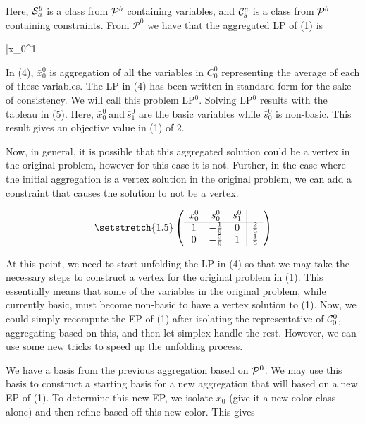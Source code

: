 \documentclass[11pt]{article} %
\newcommand{\cP}{{\cal P}}
\newcommand{\cC}{{\cal C}}
\newcommand{\cS}{{\cal S}}
\begin{document}
	Here, $\cS_a^b$ is a class from $\cP^b$ containing variables, and $\cC_b^a$ is a class from $\cP^b$ containing constraints.  From $\mathcal{P}^0$ we have that the aggregated LP of (1) is  
	
	\begin{mini!}
		{}{\bar{x}_0^1}{}{}
	\end{mini!}
	
	In (4), $\bar{x}_0^0$ is aggregation of all the variables in $C_0^0$ representing the average of each of these variables.  The LP in (4) has been written in standard form for the sake of consistency. We will call this problem LP$^0$. Solving LP$^0$ results with the tableau in (5).  Here, $\bar{x}_0^0 \ \text{and} \ \bar{s}_1^0$ are the basic variables while $\bar{s}_0^0$ is non-basic.  This result gives an objective value in (1) of 2.
	
	Now, in general, it is possible that this aggregated solution could be a vertex in the original problem, however for this case it is not.  Further, in the case where the initial aggregation is a vertex solution in the original problem, we can add a constraint that causes the solution to not be a vertex.
	
	\begin{equation}\setstretch{1.5}
	\begin{pmatrix}
	\begin{array}{ccc|c}
	\bar{x}_0^0 & \bar{s}_0^0 & \bar{s}_1^0 \\
	\hline
	1 & -\frac{1}{9} & 0 & \frac{2}{9} \\
	0 & -\frac{5}{9} & 1 & \frac{1}{9} 
	\end{array}
	\end{pmatrix}
	\end{equation}
	
	At this point, we need to start unfolding the LP in (4) so that we may take the necessary steps to construct a vertex for the original problem in (1).  This essentially means that some of the variables in the original problem, while currently basic, must become non-basic to have a vertex solution to (1).  Now, we could simply recompute the EP of (1) after isolating the representative of $\cC_0^0$, aggregating based on this, and then let simplex handle the rest.  However, we can use some new tricks to speed up the unfolding process.
	
	We have a basis from the previous aggregation based on $\cP^0$.  We  may use this basis to construct a starting basis for a new aggregation that will based on a new EP of (1).  To determine this new EP, we isolate $x_0$ (give it a new color class alone) and then refine based off this new color.  This gives
	
\end{document}

